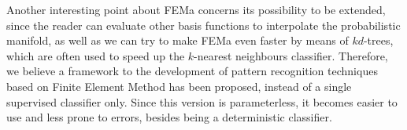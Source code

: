 Another interesting point about FEMa concerns its possibility to be extended, since the reader can evaluate other basis functions to interpolate the probabilistic manifold, as well as we can try to make FEMa even faster by means of $kd$-trees, which are often used to speed up the $k$-nearest neighbours classifier. Therefore, we believe a framework to the development of pattern recognition techniques based on Finite Element Method has been proposed, instead of a single supervised classifier only. Since this version is parameterless, it becomes easier to use and less prone to errors, besides being a deterministic classifier.
